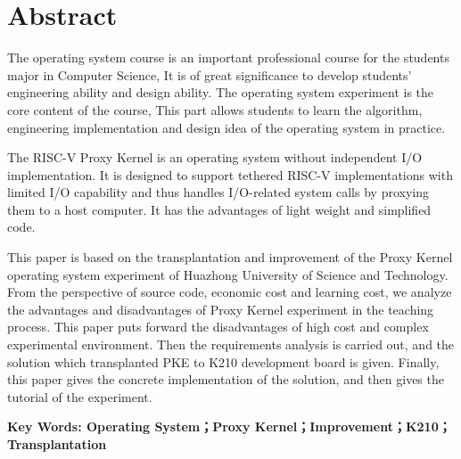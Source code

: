 \vspace*{-2mm}

\begin{spacing}{0.95}
  \centering
  \heiti{}\textbf{\thesisTitleEN}
\end{spacing}

\vspace*{17mm}

{\let\clearpage\relax \chapter*{
  \textmd{Abstract}\vskip -3bp}}
\setcounter{page}{2}

\setlength{\parskip}{0em}

The operating system course is an important professional course for the students major in Computer Science,
It is of great significance to develop students' engineering ability and design ability.
The operating system experiment is the core content of the course,
This part allows students to learn the algorithm, 
engineering implementation and design idea of the operating system in practice.

The RISC-V Proxy Kernel is an operating system without independent I/O implementation.
It is designed to support tethered RISC-V implementations with limited I/O capability and thus handles I/O-related system calls by proxying them to a host computer.
It has the advantages of light weight and simplified code.

This paper is based on the transplantation and improvement of the Proxy Kernel operating system experiment of Huazhong University of Science and Technology.
From the perspective of source code, economic cost and learning cost,
we analyze the advantages and disadvantages of Proxy Kernel experiment in the teaching process.
This paper puts forward the disadvantages of high cost and complex experimental environment.
Then the requirements analysis is carried out, and the solution which transplanted PKE to K210 development board is given.
Finally, this paper gives the concrete implementation of the solution,
and then gives the tutorial of the experiment.

\vspace{3ex}\noindent\textbf{Key Words: Operating System；Proxy Kernel；Improvement；K210；Transplantation}
\newpage
